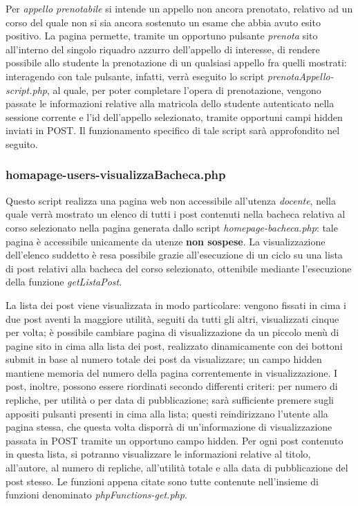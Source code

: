 \documentclass [a4paper,11pt]{book}
\begin{document}
Per \emph{appello prenotabile} si intende un appello non ancora prenotato, relativo ad un corso del quale non si sia ancora sostenuto un esame che abbia avuto esito positivo. La pagina permette, tramite un opportuno pulsante \emph{prenota} sito all'interno del singolo riquadro azzurro dell'appello di interesse, di rendere possibile allo studente la prenotazione di un qualsiasi appello fra quelli mostrati: interagendo con tale pulsante, infatti, verrà eseguito lo script \emph{prenotaAppello-script.php}, al quale, per poter completare l'opera di prenotazione, vengono passate le informazioni relative alla matricola dello studente autenticato nella sessione corrente e l'id dell'appello selezionato, tramite opportuni campi hidden inviati in POST. Il funzionamento specifico di tale script sarà approfondito nel seguito.

\medskip

\subsubsection{homapage-users-visualizzaBacheca.php}

Questo script realizza una pagina web non accessibile all'utenza \emph{docente}, nella quale verrà mostrato un elenco di tutti i post contenuti nella bacheca relativa al corso selezionato nella pagina generata dallo script \emph{homepage-bacheca.php}: tale pagina è accessibile unicamente da utenze \textbf{non sospese}. La visualizzazione dell'elenco suddetto è resa possibile grazie all'esecuzione di un ciclo su una lista di post relativi alla bacheca del corso selezionato, ottenibile mediante l'esecuzione della funzione \emph{getListaPost}. 

La lista dei post viene visualizzata in modo particolare: vengono fissati in cima i due post aventi la maggiore utilità, seguiti da tutti gli altri, visualizzati cinque per volta; è possibile cambiare pagina di visualizzazione da un piccolo menù di pagine sito in cima alla lista dei post, realizzato dinamicamente con dei bottoni submit in base al numero totale dei post da visualizzare; un campo hidden mantiene memoria del numero della pagina correntemente in visualizzazione. I post, inoltre, possono essere riordinati secondo differenti criteri: per numero di repliche, per utilità o per data di pubblicazione; sarà sufficiente premere sugli appositi pulsanti presenti in cima alla lista; questi reindirizzano l'utente alla pagina stessa, che questa volta disporrà di un'informazione di visualizzazione passata in POST tramite un opportuno campo hidden. Per ogni post contenuto in questa lista, si potranno visualizzare le informazioni relative al titolo, all'autore, al numero di repliche, all'utilità totale e alla data di pubblicazione del post stesso. Le funzioni appena citate sono tutte contenute nell'insieme di funzioni denominato \emph{phpFunctions-get.php}. 
\end{document}
